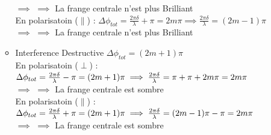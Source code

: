 \documentclass[12pt]{book}
\begin{document}
\begin{itemize}
\begin{itemize}
                            $\implies$ $\implies$ La frange centrale n'est plus Brilliant\\
                            En polarisatoin ($ \parallel $) :   $\Delta\phi_{tot}=\frac{2\pi\delta}{\lambda}+\pi=2m\pi\implies\frac{2\pi\delta}{\lambda}=(2m-1)\pi$\\
                            $\implies$ $\implies$ La frange centrale n'est plus Brilliant
                        \item Interference Destructive 
                            $\Delta\phi_{tot}= (2m+1)\pi$\\
                            En polarisatoin ($ \perp $) :   $\Delta\phi_{tot}=\frac{2\pi\delta}{\lambda}-\pi=(2m+1)\pi  \\ \implies\frac{2\pi\delta}{\lambda}=\pi + \pi + 2m\pi = 2m\pi$\\
                            $\implies$ $\implies$ La frange centrale est sombre\\
                            En polarisatoin ($ \parallel $) :   $\Delta\phi_{tot}=\frac{2\pi\delta}{\lambda}+\pi=(2m+1)\pi \\ \implies\frac{2\pi\delta}{\lambda}=(2m-1)\pi-\pi=2m\pi$ \\ 
                            $\implies$ $\implies$ La frange centrale est sombre\\
                    \end{itemize}
            \end{itemize}
\end{document}
